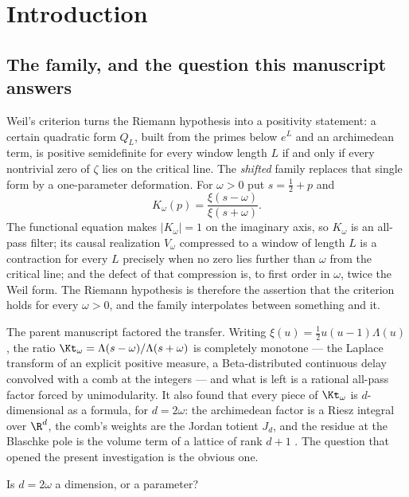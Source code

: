 \section{Introduction}\label{sec:intro}

\subsection{The family, and the question this manuscript answers}\label{sec:intro-family}

Weil's criterion turns the Riemann hypothesis into a positivity statement: a
certain quadratic form $Q_L$, built from the primes below $e^{L}$ and an
archimedean term, is positive semidefinite for every window length $L$ if and
only if every nontrivial zero of $\zeta$ lies on the critical line. The
\emph{shifted} family \cite{WilsonLines} replaces that single form by a
one-parameter deformation. For $\omega>0$ put $s=\frac12+p$ and
\[
 K_\omega(p)=\frac{\xi(s-\omega)}{\xi(s+\omega)} .
\]
The functional equation makes $\lvert K_\omega\rvert=1$ on the imaginary axis, so
$K_\omega$ is an all-pass filter; its causal realization $V_\omega$ compressed to
a window of length $L$ is a contraction for every $L$ precisely when no zero lies
further than $\omega$ from the critical line; and the defect of that compression
is, to first order in $\omega$, twice the Weil form. The Riemann hypothesis is
therefore the assertion that the criterion holds for every $\omega>0$, and the
family interpolates between something and it.

The parent manuscript \cite{Markov} factored the transfer. Writing
$\xi(u)=\frac12u(u-1)\Lambda(u)$, the ratio
$\Kt_\omega=\Lambda(s-\omega)/\Lambda(s+\omega)$ is completely monotone --- the
Laplace transform of an explicit positive measure, a Beta-distributed continuous
delay convolved with a comb at the integers --- and what is left is a rational
all-pass factor forced by unimodularity. It also found that every piece of
$\Kt_\omega$ is $d$-dimensional as a formula, for $d=2\omega$: the archimedean
factor is a Riesz integral over $\R^{d}$, the comb's weights are the Jordan
totient $J_d$, and the residue at the Blaschke pole is the volume term of a
lattice of rank $d+1$ \cite{HalfDimension,OpeningNote,WhichDimension}. The
question that opened the present investigation is the obvious one.

\begin{problem}\label{prob:main}
Is $d=2\omega$ a dimension, or a parameter?
\end{problem}

